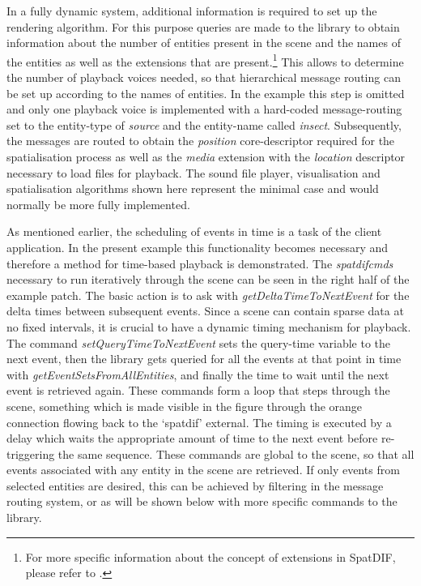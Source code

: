 \documentclass{article}
\begin{document}
In a fully dynamic system, additional information is required to set up the rendering algorithm.
For this purpose queries are made to the library to obtain information about the number of entities present in the scene and the names of the entities as well as the extensions that are present.\footnote{For more specific information about the concept of extensions in SpatDIF, please refer to \cite{SpatDIF_SMC12, Peters:2013SpatDifCMJ, SpatDIF_03}. }
This allows to determine the number of playback voices needed, so that hierarchical message routing can be set up according to the names of entities.
In the example this step is omitted and only one playback voice is implemented with a hard-coded message-routing set to the entity-type of \emph{source} and the entity-name called \emph{insect}.
Subsequently, the messages are routed to obtain the \emph{position} core-descriptor required for the spatialisation process as well as the \emph{media} extension with the \emph{location} descriptor necessary to load files for playback.
The sound file player, visualisation and spatialisation algorithms \cite{Schacher_ICMC_2006} shown here represent the minimal case and would normally be more fully implemented. %

As mentioned earlier, the scheduling of events in time is a task of the client application. 
In the present example this functionality becomes necessary and therefore a method for time-based playback is demonstrated.
The \emph{spatdifcmds} necessary to run iteratively through the scene can be seen in the right half of the example patch.
The basic action is to ask with \emph{getDeltaTimeToNextEvent} for the delta times between subsequent events.
Since a scene can contain sparse data at no fixed intervals, it is crucial to have a dynamic timing mechanism for playback.
The command \emph{setQueryTimeToNextEvent} sets the query-time variable to the next event, then the library gets queried for all the events at that point in time with \emph{getEventSetsFromAllEntities}, and finally the time to wait until the next event is retrieved again.
These commands form a loop that steps through the scene, something which is made visible in the figure through the orange connection flowing back to the `spatdif' external.
The timing is executed by a delay which waits the appropriate amount of time to the next event before re-triggering the same sequence.
These commands are global to the scene, so that all events associated with any entity in the scene are retrieved.
If only events from selected entities are desired, this can be achieved by filtering in the message routing system, or as will be shown below with more specific commands to the library. %
\end{document}
